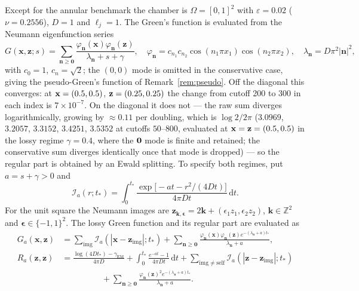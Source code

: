 \documentclass[pdflatex,sn-mathphys-num]{sn-jnl}
\numberwithin{equation}{section}
\theoremstyle{thmstyleone}%
\theoremstyle{definition}
\theoremstyle{remark}
\newcommand{\dd}{\,\mathrm{d}}
\begin{document}
Except for the annular benchmark the chamber is $\Omega=[0,1]^2$ with $\varepsilon=0.02$ ($\nu=0.2556$), $D=1$ and $\ell_j=1$. The Green's function is evaluated from the Neumann eigenfunction series
\begin{equation}
G(\mathbf x,\mathbf z;s)=\sum_{\mathbf n\ge\mathbf 0}
\frac{\varphi_{\mathbf n}(\mathbf x)\varphi_{\mathbf n}(\mathbf z)}
{\lambda_{\mathbf n}+s+\gamma},\quad
\varphi_{\mathbf n}=c_{n_1}c_{n_2}\cos(n_1\pi x_1)\cos(n_2\pi x_2),\quad
\lambda_{\mathbf n}=D\pi^2|\mathbf n|^2,
\label{eq:series}
\end{equation}
with $c_0=1$, $c_n=\sqrt2$; the $(0,0)$ mode is omitted in the conservative case, giving the pseudo-Green's function of Remark~\ref{rem:pseudo}. Off the diagonal this converges: at ${\bf x}=(0.5,0.5)$, ${\bf z}=(0.25,0.25)$ the change from cutoff 200 to 300 in each index is $7\times 10^{-7}$. On the diagonal it does not --- the raw sum diverges logarithmically, growing by $\approx0.11$ per doubling, which is $\log 2/2\pi$ ($3.0969$, $3.2057$, $3.3152$, $3.4251$, $3.5352$ at cutoffs $50$--$800$, evaluated at ${\bf x}={\bf z}=(0.5,0.5)$ in the lossy regime $\gamma=0.4$, where the ${\bf 0}$ mode is finite and retained; the conservative sum diverges identically once that mode is dropped) --- so the regular part is obtained by an Ewald splitting. To specify both regimes, put $a=s+\gamma>0$ and
\[
\mathcal I_a(r;t_*)=\int_0^{t_*}\frac{\exp\bigl[-at-r^2/(4Dt)\bigr]}{4\pi Dt}\dd t.
\]
For the unit square the Neumann images are $\mathbf z_{\mathbf k,\boldsymbol\epsilon}=2\mathbf k+
(\epsilon_1z_1,\epsilon_2z_2)$, $\mathbf k\in\mathbb Z^2$ and $\boldsymbol\epsilon\in\{-1,1\}^2$. The lossy Green function and its regular part are evaluated as
\begin{align}
G_a(\mathbf x,\mathbf z)&=\sum_{\mathrm{img}}
\mathcal I_a(|\mathbf x-\mathbf z_{\mathrm{img}}|;t_*)
+\sum_{\mathbf n\ge\mathbf0}\frac{\varphi_{\mathbf n}(\mathbf x)
\varphi_{\mathbf n}(\mathbf z)e^{-(\lambda_{\mathbf n}+a)t_*}}
{\lambda_{\mathbf n}+a},\nonumber\\
R_a(\mathbf z,\mathbf z)&=\frac{\log(4Dt_*)-\gamma_{\mathrm{EM}}}{4\pi D}
+\int_0^{t_*}\frac{e^{-at}-1}{4\pi Dt}\dd t
+\sum_{\mathrm{img}\ne\mathrm{self}}\mathcal I_a(
|\mathbf z-\mathbf z_{\mathrm{img}}|;t_*)\nonumber\\
&\hspace{2cm}+\sum_{\mathbf n\ge\mathbf0}
\frac{\varphi_{\mathbf n}(\mathbf z)^2e^{-(\lambda_{\mathbf n}+a)t_*}}
{\lambda_{\mathbf n}+a}.
\label{eq:ewaldloss}
\end{align}
\end{document}
